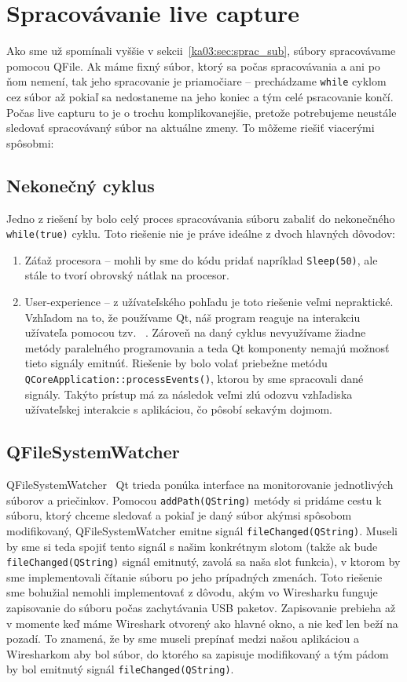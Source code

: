 \section{Spracovávanie live capture}
Ako sme už spomínali vyššie v sekcii~\ref{ka03:sec:sprac_sub}, súbory spracovávame pomocou QFile. Ak máme fixný súbor, ktorý sa počas spracovávania a ani po ňom nemení, tak jeho spracovanie je priamočiare -- prechádzame \texttt{while} cyklom cez súbor až pokiaľ sa nedostaneme na jeho koniec a tým celé psracovanie končí. Počas live capturu to je o trochu komplikovanejšie, pretože potrebujeme neustále sledovať spracovávaný súbor na aktuálne zmeny. To môžeme riešiť viacerými spôsobmi:

\subsection*{Nekonečný cyklus}
Jedno z riešení by bolo celý proces spracovávania súboru zabaliť do nekonečného \texttt{while(true)} cyklu. Toto riešenie nie je práve ideálne z dvoch hlavných dôvodov:
\begin{enumerate}
\item Záťaž procesora -- mohli by sme do kódu pridať napríklad \texttt{Sleep(50)}, ale stále to tvorí obrovský nátlak na procesor.
\item User-experience -- z užívateľského pohľadu je toto riešenie veľmi nepraktické. Vzhľadom na to, že používame Qt, náš program reaguje na interakciu užívateľa pomocou tzv. ~\cite{signal_slot}. Zároveň na daný cyklus nevyužívame žiadne metódy paralelného programovania a teda Qt komponenty nemajú možnosť tieto signály emitnúť. Riešenie by bolo volať priebežne metódu \texttt{QCoreApplication::processEvents()}, ktorou by sme spracovali dané signály. Takýto prístup má za následok veľmi zlú odozvu vzhľadiska užívateľskej interakcie s aplikáciou, čo pôsobí sekavým dojmom.
\end{enumerate}

\subsection*{QFileSystemWatcher}
QFileSystemWatcher~\cite{qfilesystemwatcher} Qt trieda ponúka interface na monitorovanie jednotlivých súborov a priečinkov. Pomocou \texttt{addPath(QString)} metódy si pridáme cestu k súboru, ktorý chceme sledovať a pokiaľ je daný súbor akýmsi spôsobom modifikovaný, QFileSystemWatcher emitne signál \texttt{fileChanged(QString)}. Museli by sme si teda spojiť tento signál s našim konkrétnym slotom (takže ak bude \texttt{fileChanged(QString)} signál emitnutý, zavolá sa naša slot funkcia), v ktorom by sme implementovali čítanie súboru po jeho prípadných zmenách. Toto riešenie sme bohužial nemohli implementovať z dôvodu, akým vo Wiresharku funguje zapisovanie do súboru počas zachytávania USB paketov. Zapisovanie prebieha až v momente keď máme Wireshark otvorený ako hlavné okno, a nie keď len beží na pozadí. To znamená, že by sme museli prepínať medzi našou aplikáciou a Wiresharkom aby bol súbor, do ktorého sa zapisuje modifikovaný a tým pádom by bol emitnutý signál \texttt{fileChanged(QString)}.

